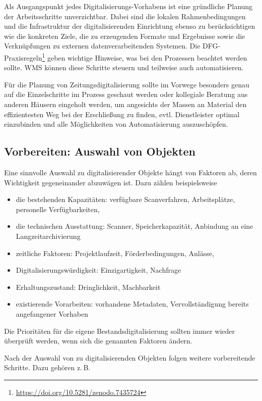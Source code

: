 \documentclass[
  11pt,
  letterpaper,
  DIV=11,
  twoside]{scrreprt}
\DeclareRobustCommand{\href}[2]{#2\footnote{\url{#1}}}
\begin{document}
Als Ausgangspunkt jedes Digitalisierungs-Vorhabens ist eine gründliche
Planung der Arbeitsschritte unverzichtbar. Dabei sind die lokalen
Rahmenbedingungen und die Infrastruktur der digitalisierenden
Einrichtung ebenso zu berücksichtigen wie die konkreten Ziele, die zu
erzeugenden Formate und Ergebnisse sowie die Verknüpfungen zu externen
datenverarbeitenden Systemen. Die
\href{https://doi.org/10.5281/zenodo.7435724}{DFG-Praxisregeln} geben
wichtige Hinweise, was bei den Prozessen beachtet werden sollte. WMS
können diese Schritte steuern und teilweise auch automatisieren.

Für die Planung von Zeitungsdigitalisierung sollte im Vorwege besonders
genau auf die Einzelschritte im Prozess geschaut werden oder kollegiale
Beratung aus anderen Häusern eingeholt werden, um angesichts der Massen
an Material den effizientesten Weg bei der Erschließung zu finden, evtl.
Dienstleister optimal einzubinden und alle Möglichkeiten von
Automatisierung auszuschöpfen.

\subsection{Vorbereiten: Auswahl von
Objekten}\label{vorbereiten-auswahl-von-objekten}

Eine sinnvolle Auswahl zu digitalisierender Objekte hängt von Faktoren
ab, deren Wichtigkeit gegeneinander abzuwägen ist. Dazu zählen
beispielsweise

\begin{itemize}
\item
  die bestehenden Kapazitäten: verfügbare Scanverfahren, Arbeitsplätze,
  personelle Verfügbarkeiten,
\item
  die technischen Ausstattung: Scanner, Speicherkapazität, Anbindung an
  eine Langzeitarchivierung
\item
  zeitliche Faktoren: Projektlaufzeit, Förderbedingungen, Anlässe,
\item
  Digitalisierungswürdigkeit: Einzigartigkeit, Nachfrage
\item
  Erhaltungszustand: Dringlichkeit, Machbarkeit
\item
  existierende Vorarbeiten: vorhandene Metadaten, Vervollständigung
  bereits angefangener Vorhaben
\end{itemize}

Die Prioritäten für die eigene Bestandsdigitalisierung sollten immer
wieder überprüft werden, wenn sich die genannten Faktoren ändern.

Nach der Auswahl von zu digitalisierenden Objekten folgen weitere
vorbereitende Schritte. Dazu gehören z.\,B.
\end{document}
